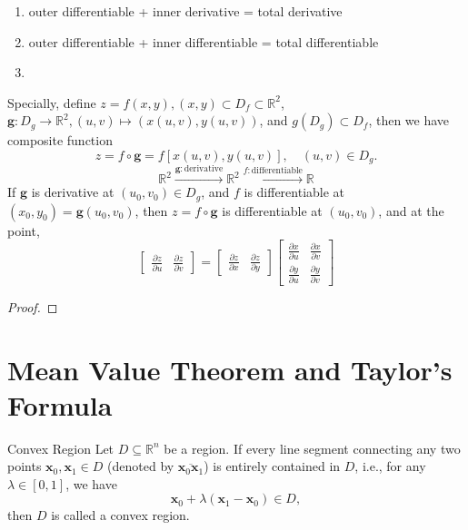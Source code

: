 \documentclass[11pt]{../../TexTemplate/elegantbook}
\begin{document}
\begin{note}
    \begin{enumerate}
        \item  outer differentiable + inner derivative = total derivative
        \item  outer differentiable + inner differentiable = total differentiable
        \item  
    \end{enumerate}
\end{note}

Specially, define \( z = f(x, y), (x,y)\subset D_{f}\subset \mathbb{R}^{2} \), 
\(\mathbf{g}:D_{g}\to \mathbb{R}^{2}, (u,v)\mapsto (x(u,v), y(u,v))\), 
and \(g(D_{g})\subset D_{f}\), 
then we have composite function
\[
z = f \circ \mathbf{g} = f\left[x(u,v), y(u,v)\right],\quad (u,v)\in D_{g}.
\]
\[
\mathbb{R}^{2}\xrightarrow{\mathbf{g}:\text{derivative}}\mathbb{R}^{2}\xrightarrow{f:\text{differentiable}}\mathbb{R}
\]
If \(\mathbf{g}\) is derivative at \((u_{0}, v_{0})\in D_{g}\), 
and \(f\) is differentiable at \((x_{0}, y_{0}) = \mathbf{g}(u_{0}, v_{0})\), 
then \(z = f \circ \mathbf{g}\) is differentiable at \((u_{0}, v_{0})\), and at the point,
\[
    \begin{bmatrix} 
        \frac{\partial z}{\partial u}   & \frac{\partial z}{\partial v} 
    \end{bmatrix} 
    =
    \begin{bmatrix}
        \frac{\partial z}{\partial x} & \frac{\partial z}{\partial y}
    \end{bmatrix}
    \begin{bmatrix} 
        \frac{\partial x}{\partial u} & \frac{\partial x}{\partial v} \\
        \frac{\partial y}{\partial u} & \frac{\partial y}{\partial v}
    \end{bmatrix} 
\]

\begin{proof}
    
\end{proof}

\section{Mean Value Theorem and Taylor's Formula}

\begin{definition}{Convex Region}
    Let \(D \subseteq \mathbb{R}^n\) be a region. 
    If every line segment connecting any two points \(\mathbf{x}_0, \mathbf{x}_1 \in D\) 
    (denoted by \(\overline{\mathbf{x}_0 \mathbf{x}_1}\))
    is entirely contained in \(D\), i.e., for any \(\lambda \in [0, 1]\), we have  
    \[
    \mathbf{x}_0 + \lambda (\mathbf{x}_1 - \mathbf{x}_0) \in D,
    \]
    then \(D\) is called a convex region.
\end{definition}
\end{document}
